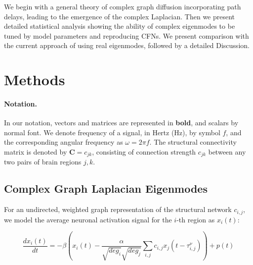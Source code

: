 \documentclass{article}
\begin{document}
We begin with a general theory of complex graph diffusion incorporating path delays, leading to the emergence of the complex Laplacian. Then we present detailed statistical analysis showing the ability of complex eigenmodes to be tuned by model parameters and reproducing CFNs. We present comparison with the current approach of using real eigenmodes, followed by a detailed Discussion.


\section{Methods}

\label{sec:methods}

\paragraph{Notation.} In our notation, vectors and matrices are represented in \textbf{bold}, and scalars by normal font. We denote frequency of a signal, in Hertz (Hz), by symbol $f$, and the corresponding angular frequency as $\omega = 2 \pi f$. The structural connectivity matrix is denoted by $\bm{C} = c_{jk}$, consisting of connection strength $c_{jk}$ between any two pairs of brain regions $j,k$.


\subsection{Complex Graph Laplacian Eigenmodes}

For an undirected, weighted graph representation of the structural network $c_{i,j}$, we model the average neuronal activation signal for the $i$-th region as $x_{i}(t)$:

\begin{equation} \label{eq1}
\frac{dx_{i}(t)}{dt} = -\beta (x_{i}(t) - \frac{\alpha}{\sqrt{deg_i}\sqrt{deg_j}} \sum_{i,j} c_{i,j} x_{j}(t-\tau^{\nu}_{i,j})) + p(t)
\end{equation}
\end{document}
